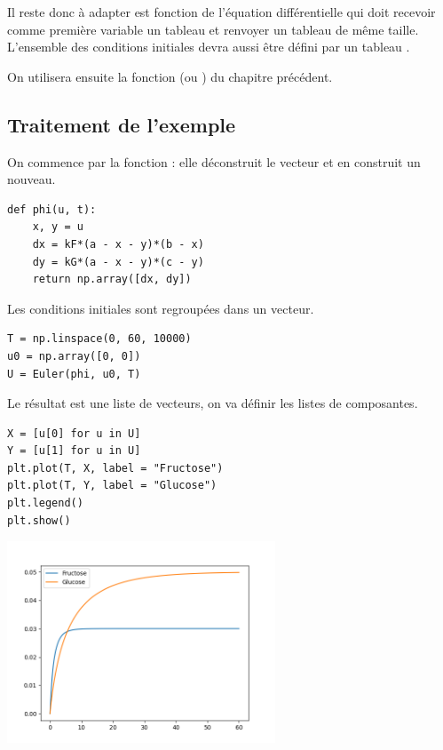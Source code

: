 Il reste donc à adapter est fonction de l'équation différentielle qui doit recevoir comme première variable un tableau  et renvoyer un tableau  de même taille. L'ensemble des conditions initiales devra aussi être défini par un tableau .

On utilisera ensuite la fonction  (ou ) du chapitre précédent.
\subsection{Traitement de l'exemple}
On commence par la fonction : elle déconstruit le vecteur et en construit un nouveau.
\begin{lstlisting}
def phi(u, t):
    x, y = u
    dx = kF*(a - x - y)*(b - x)
    dy = kG*(a - x - y)*(c - y)
    return np.array([dx, dy])
\end{lstlisting}
Les conditions initiales sont regroupées dans un vecteur.
\begin{lstlisting}
T = np.linspace(0, 60, 10000)
u0 = np.array([0, 0])
U = Euler(phi, u0, T)
\end{lstlisting}
Le résultat est une liste de vecteurs, on va définir les listes de composantes.
\begin{lstlisting}
X = [u[0] for u in U]
Y = [u[1] for u in U]
plt.plot(T, X, label = "Fructose")
plt.plot(T, Y, label = "Glucose")
plt.legend()
plt.show()
\end{lstlisting}
\begin{center}
\includegraphics[width=8cm]{Cours/Images/ED2_glucose.png}
\end{center}
